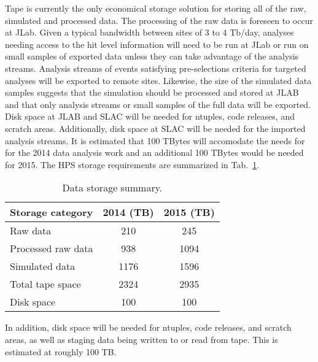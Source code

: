 Tape is currently the only economical storage
solution for storing all of the raw, simulated and processed data.
The processing of the raw data is foreseen to occur at JLab. Given a
typical bandwidth between sites of 3 to 4 Tb/day, analyses needing
access to the hit level information will need to be run at JLab or run
on small samples of exported data unless they can take advantage of the
analysis streams. Analysis streams of events satisfying
pre-selections criteria for targeted analyses will be exported to remote
sites. Likewise, the size of the simulated data samples suggests that
the simulation should be processed and stored at JLAB and that 
only analysis streams or small samples of the full data will be
exported.
Disk space at JLAB and SLAC will be 
needed for ntuples, code releases, and scratch areas. Additionally, disk space at SLAC will be needed for the imported analysis streams. It is estimated that
100 TBytes will accomodate the needs for for the 2014 data analysis work
and an additional 100 TBytes would be needed for 2015.
The HPS storage requirements are summarized in Tab.~\ref{tab:datastorage}.
\begin{table}[tbp]
\centering
\begin{tabular}{|l|c|c|}
\hline
Storage category & 2014 (TB) & 2015 (TB) \\
\hline
Raw data & 210 & 245 \\
Processed raw data & 938 & 1094 \\
Simulated data & 1176 & 1596 \\
\hline
Total tape space & 2324 & 2935 \\
\hline
Disk space  & 100  & 100 \\
\hline
\end{tabular}
\caption{{\small Data storage summary.}}
\label{tab:datastorage}
\end{table}

In addition, disk space will be 
needed for ntuples, code releases, and scratch areas, as well as staging data being written to or read from tape. This is estimated at roughly 100 TB.

